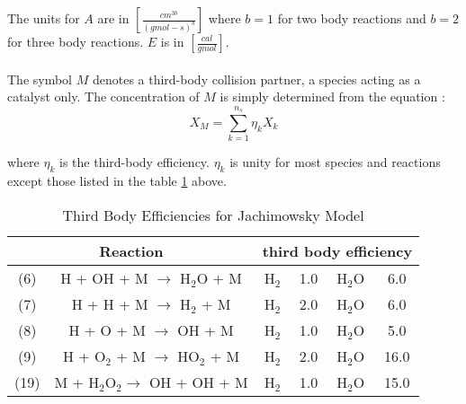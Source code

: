 The units for $A$ are in $[\frac{cm^{3b}}{(gmol-s)^b}]$ where $b=1$ for two body reactions and 
$b=2$ for three body reactions. $E$ is in $[\frac{cal}{gmol}]$.\\
\\

The symbol $M$ denotes a third-body collision partner, a species acting as a catalyst only.
The concentration of $M$ is simply determined from the equation :\\

\begin{displaymath}
X_M = \sum_{k=1}^{n_s} \eta_k X_k
\end{displaymath}
\clearpage

where $\eta_k$ is the third-body efficiency. $\eta_k$ is unity
for most species and reactions except those listed in the table 
\ref{thirds} above.

\vspace*{-3cm}
\begin{table}
\begin{threeparttable}
\caption{Third Body Efficiencies for Jachimowsky Model}
\begin{tabular}{|cc|cccc|} \hline
\multicolumn{2}{|c|}{Reaction} & \multicolumn{4}{|c|}{third body efficiency} \\ \hline \hline
(6) & H + OH + M $\rightarrow$ H$_{2}$O + M & H$_{2}$ & 1.0 & H$_{2}$O & 6.0 \\
(7) & H + H + M $\rightarrow$ H$_{2}$ + M & H$_{2}$ & 2.0 & H$_{2}$O & 6.0 \\
(8) & H + O + M $\rightarrow$ OH + M & H$_{2}$ & 1.0 & H$_{2}$O & 5.0 \\
(9) & H + O$_{2}$ + M $\rightarrow$ HO$_{2}$ + M & H$_{2}$ & 2.0 & H$_{2}$O & 16.0 \\
(19) & M + H$_{2}$O$_{2} \rightarrow$ OH + OH + M & H$_{2}$ & 1.0 & H$_{2}$O & 15.0 \\
\hline
\end{tabular}
\label{thirds}
\end{threeparttable}
\end{table}



